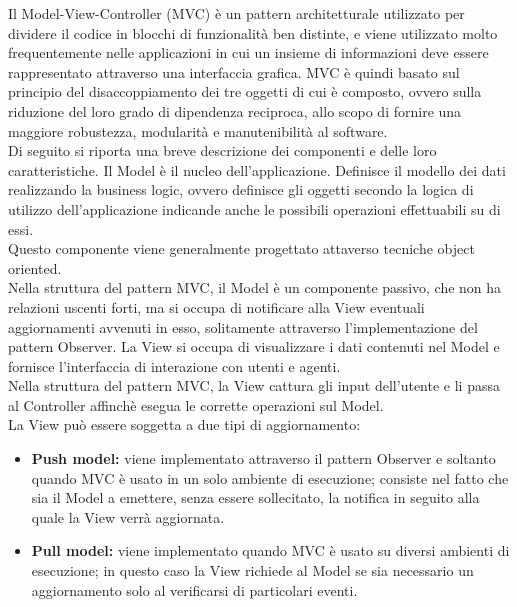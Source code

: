 	 \label{app:MVC}
		Il Model-View-Controller (MVC) è un pattern architetturale utilizzato per dividere il codice in blocchi di funzionalità ben distinte, e viene utilizzato molto frequentemente nelle applicazioni in cui un insieme di informazioni deve essere rappresentato attraverso una interfaccia grafica.
			MVC è quindi basato sul principio del disaccoppiamento dei tre oggetti di cui è composto, ovvero sulla riduzione del loro grado di dipendenza reciproca, allo scopo di fornire una maggiore robustezza, modularità e manutenibilità al software.\\
			Di seguito si riporta una breve descrizione dei componenti e delle loro caratteristiche. 
				Il Model è il nucleo dell'applicazione. Definisce il modello dei dati realizzando la business logic, ovvero definisce gli oggetti secondo la logica di utilizzo dell'applicazione indicande anche le possibili operazioni effettuabili su di essi.\\
				Questo componente viene generalmente progettato attaverso tecniche object oriented.\\
				Nella struttura del pattern MVC, il Model è un componente passivo, che non ha relazioni uscenti forti, ma si occupa di notificare alla View eventuali aggiornamenti avvenuti in esso, solitamente attraverso l'implementazione del pattern Observer.
				La View si occupa di visualizzare i dati contenuti nel Model e fornisce l'interfaccia di interazione con utenti e agenti.\\
				Nella struttura del pattern MVC, la View cattura gli input dell'utente e li passa al Controller affinchè esegua le corrette operazioni sul Model. \\
				La View può essere soggetta a due tipi di aggiornamento:
				\begin{itemize}
					\item \textbf{Push model:} viene implementato attraverso il pattern Observer e soltanto quando MVC è usato in un solo ambiente di esecuzione; consiste nel fatto che sia il Model a emettere, senza essere sollecitato, la notifica in seguito alla quale la View verrà aggiornata.
					\item \textbf{Pull model:} viene implementato quando MVC è usato su diversi ambienti di esecuzione; in questo caso la View richiede al Model se sia necessario un aggiornamento solo al verificarsi di particolari eventi.
				\end{itemize}
